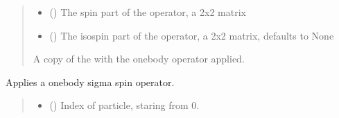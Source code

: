 \documentclass[letterpaper,10pt,english]{sphinxmanual}
\begin{document}
\begin{fulllineitems}
\begin{fulllineitems}
\begin{quote}
\begin{description}
\begin{itemize}
\item {} 
\sphinxAtStartPar
{} () \textendash{} The spin part of the operator, a 2x2 matrix

\item {} 
\sphinxAtStartPar
{} (\sphinxstyleliteralemphasis{\sphinxupquote{, }}) \textendash{} The isospin part of the operator, a 2x2 matrix, defaults to None

\end{itemize}

\sphinxAtStartPar
A copy of the  with the one\sphinxhyphen{}body operator applied.

\sphinxAtStartPar
{\hyperref[\detokenize{spinbox:spinbox.core.HilbertOperator}]{}}

\end{description}\end{quote}

\end{fulllineitems}


\begin{fulllineitems}
\label{\detokenize{spinbox:spinbox.core.HilbertOperator.apply_sigma}}
\pysigstartsignatures
{}
\pysigstopsignatures
\sphinxAtStartPar
Applies a one\sphinxhyphen{}body sigma spin operator.
\begin{quote}\begin{description}
\begin{itemize}
\item {} 
\sphinxAtStartPar
{} () \textendash{} Index of particle, staring from 0.


\end{itemize}
\end{description}
\end{quote}
\end{fulllineitems}
\end{fulllineitems}
\end{document}
